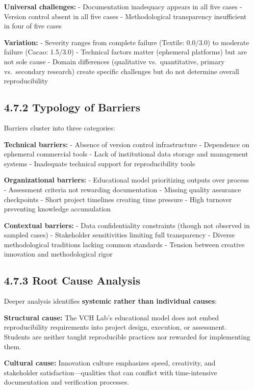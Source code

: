 \documentclass[
  oneside,
  open=any]{scrbook}
\begin{document}
\textbf{Universal challenges:} - Documentation inadequacy appears in all
five cases - Version control absent in all five cases - Methodological
transparency insufficient in four of five cases

\textbf{Variation:} - Severity ranges from complete failure (Textile:
0.0/3.0) to moderate failure (Cacao: 1.5/3.0) - Technical factors matter
(ephemeral platforms) but are not sole cause - Domain differences
(qualitative vs.~quantitative, primary vs.~secondary research) create
specific challenges but do not determine overall reproducibility

\subsection{4.7.2 Typology of Barriers}\label{typology-of-barriers}

Barriers cluster into three categories:

\textbf{Technical barriers:} - Absence of version control infrastructure
- Dependence on ephemeral commercial tools - Lack of institutional data
storage and management systems - Inadequate technical support for
reproducibility tools

\textbf{Organizational barriers:} - Educational model prioritizing
outputs over process - Assessment criteria not rewarding documentation -
Missing quality assurance checkpoints - Short project timelines creating
time pressure - High turnover preventing knowledge accumulation

\textbf{Contextual barriers:} - Data confidentiality constraints (though
not observed in sampled cases) - Stakeholder sensitivities limiting full
transparency - Diverse methodological traditions lacking common
standards - Tension between creative innovation and methodological rigor

\subsection{4.7.3 Root Cause Analysis}\label{root-cause-analysis}

Deeper analysis identifies \textbf{systemic rather than individual
causes}:

\textbf{Structural cause:} The VCH Lab's educational model does not
embed reproducibility requirements into project design, execution, or
assessment. Students are neither taught reproducible practices nor
rewarded for implementing them.

\textbf{Cultural cause:} Innovation culture emphasizes speed,
creativity, and stakeholder satisfaction---qualities that can conflict
with time-intensive documentation and verification processes.
\end{document}
